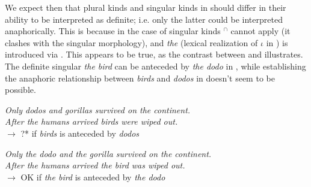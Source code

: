 \documentclass[output=paper,
modfonts
]{langscibook}
\begin{document}
	We expect then that plural kinds and singular kinds in  should differ in their ability to be interpreted as definite; i.e. only the latter could be interpreted anaphorically.
	This is because in the case of singular kinds $^\cap$ cannot apply (it clashes with the singular  morphology), and \textit{the} (lexical realization of $\iota$ in ) is introduced via .
	This appears to be true, as the contrast between  and  illustrates. The definite singular \textit{the bird} can be anteceded by \textit{the dodo} in , while establishing the anaphoric relationship between  \textit{birds} and \textit{dodos} in  doesn't seem to be possible.
	
	\ea \label{ex:despic:44} 
	\textit{Only dodos and gorillas survived on the continent.} \\
	\textit{After the humans arrived birds were wiped out.} \\
	$\rightarrow$ ?* if \textit{birds} is anteceded by \textit{dodos}
	\z 
	
	\ea \label{ex:despic:45}
	\textit{Only the dodo and the gorilla survived on the continent.} \\
	\textit{After the humans arrived the bird was wiped out.} \\
	$\rightarrow$ OK if \textit{the bird} is anteceded by \textit{the dodo}
	\z 
	
\end{document}
